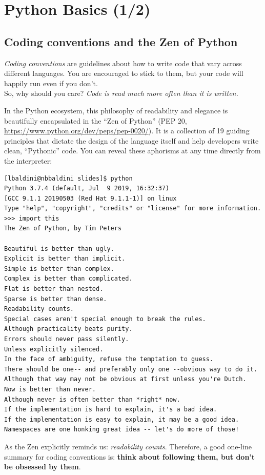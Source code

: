 \section{Python Basics (1/2)}

\subsection{Coding conventions and the Zen of Python}

\emph{Coding conventions} are guidelines about how to write code that vary across different languages. You are encouraged to stick to them, but your code will happily run even if you don't. \\
So, why should you care? \textit{Code is read much more often than it is written.}

In the Python ecosystem, this philosophy of readability and elegance is beautifully encapsulated in the ``Zen of Python'' (PEP 20, \url{https://www.python.org/dev/peps/pep-0020/}). It is a collection of 19 guiding principles that dictate the design of the language itself and help developers write clean, ``Pythonic'' code. You can reveal these aphorisms at any time directly from the interpreter:

\begin{verbatim}
[lbaldini@nbbaldini slides]$ python
Python 3.7.4 (default, Jul  9 2019, 16:32:37)
[GCC 9.1.1 20190503 (Red Hat 9.1.1-1)] on linux
Type "help", "copyright", "credits" or "license" for more information.
>>> import this
The Zen of Python, by Tim Peters

Beautiful is better than ugly.
Explicit is better than implicit.
Simple is better than complex.
Complex is better than complicated.
Flat is better than nested.
Sparse is better than dense.
Readability counts.
Special cases aren't special enough to break the rules.
Although practicality beats purity.
Errors should never pass silently.
Unless explicitly silenced.
In the face of ambiguity, refuse the temptation to guess.
There should be one-- and preferably only one --obvious way to do it.
Although that way may not be obvious at first unless you're Dutch.
Now is better than never.
Although never is often better than *right* now.
If the implementation is hard to explain, it's a bad idea.
If the implementation is easy to explain, it may be a good idea.
Namespaces are one honking great idea -- let's do more of those!
\end{verbatim}

As the Zen explicitly reminds us: \textit{readability counts}. Therefore, a good one-line summary for coding conventions is: \textbf{think about following them, but don't be obsessed by them}.

